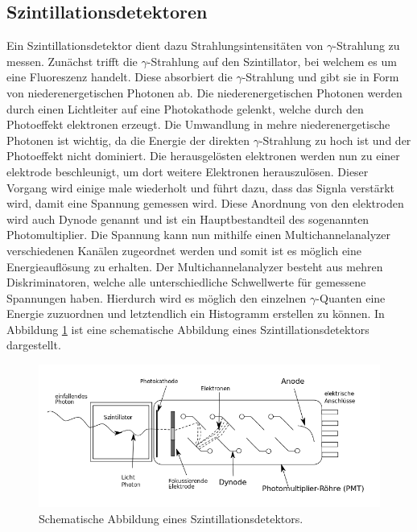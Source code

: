 \subsection{Szintillationsdetektoren}
Ein Szintillationsdetektor dient dazu Strahlungsintensitäten von $ \gamma$-Strahlung zu messen. Zunächst trifft die $\gamma$-Strahlung auf den Szintillator, bei welchem es um eine Fluoreszenz handelt. Diese absorbiert die $\gamma$-Strahlung und gibt sie in Form von niederenergetischen Photonen ab. 
Die niederenergetischen Photonen werden durch einen Lichtleiter auf eine Photokathode gelenkt, welche durch den Photoeffekt elektronen erzeugt. Die Umwandlung in mehre niederenergetische Photonen ist wichtig, da die Energie der direkten $\gamma$-Strahlung zu hoch ist und der Photoeffekt nicht dominiert.
Die herausgelösten elektronen werden nun zu einer elektrode beschleunigt, um dort weitere Elektronen herauszulösen. Dieser Vorgang wird einige male wiederholt und führt dazu, dass das Signla verstärkt wird, damit eine Spannung gemessen wird.
Diese Anordnung von den elektroden wird auch Dynode genannt und ist ein Hauptbestandteil des sogenannten Photomultiplier. 
Die Spannung kann nun mithilfe einen Multichannelanalyzer verschiedenen Kanälen zugeordnet werden und somit ist es möglich eine Energieauflösung zu erhalten. 
Der Multichannelanalyzer besteht aus mehren Diskriminatoren, welche alle unterschiedliche Schwellwerte für gemessene Spannungen haben. Hierdurch wird es möglich den einzelnen $\gamma$-Quanten eine Energie zuzuordnen und letztendlich ein Histogramm erstellen zu können.
In Abbildung \ref{fig:detektor} ist eine schematische Abbildung eines Szintillationsdetektors dargestellt.
\begin{figure}
    \centering
    \includegraphics[width = \linewidth]{content/detektor.png}
    \caption{Schematische Abbildung eines Szintillationsdetektors. \cite{detektor}}
    \label{fig:detektor}
\end{figure}
